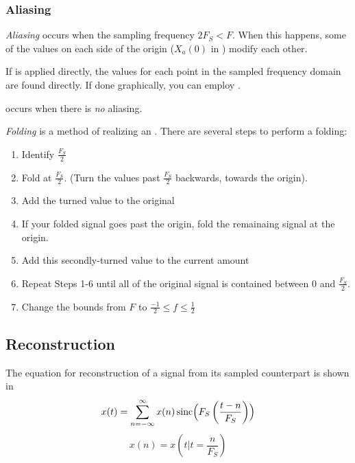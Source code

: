 \subsubsection{Aliasing}\label{subsubsec:Aliasing}
\begin{definition}[Aliasing]\label{def:Aliasing}
  \emph{Aliasing} occurs when the sampling frequency $2 F_{S}< F$.
  When this happens, some of the values on each side of the origin ($X_{a}(0)$ in ) modify each other.

  If  is applied directly, the values for each point in the sampled frequency domain are found directly.
  If done graphically, you can employ .

  \begin{remark}
     occurs when there is \emph{no} aliasing.
  \end{remark}
\end{definition}

\begin{definition}[Folding]\label{def:Folding}
  \emph{Folding} is a method of realizing an .
  There are several steps to perform a folding:
  \begin{enumerate}[noitemsep]
  \item Identify $\frac{F_{S}}{2}$
  \item Fold at $\frac{F_{S}}{2}$. (Turn the values past $\frac{F_{S}}{2}$ backwards, towards the origin).
  \item Add the turned value to the original
  \item If your folded signal goes past the origin, fold the remainaing signal at the origin.
  \item Add this secondly-turned value to the current amount
  \item Repeat Steps 1-6 until all of the original signal is contained between $0$ and $\frac{F_{S}}{2}$.
  \item Change the bounds from $F$ to $\frac{-1}{2} \leq f \leq \frac{1}{2}$
  \end{enumerate}
\end{definition}

\subsection{Reconstruction}\label{subsec:Reconstruction}
The equation for reconstruction of a signal from its sampled counterpart is shown in 
\begin{equation}\label{eq:Reconstruction}
  x(t) = \sum\limits_{n=-\infty}^{\infty} x(n) \operatorname{sinc}\Bigl( F_{S} \left( \frac{t-n}{F_{S}} \right) \Bigr)
\end{equation}
\begin{equation}\label{eq:Reconstruction_Sufficient_Sampling}
  x(n) = x(t \vert t = \frac{n}{F_{S}})
\end{equation}

